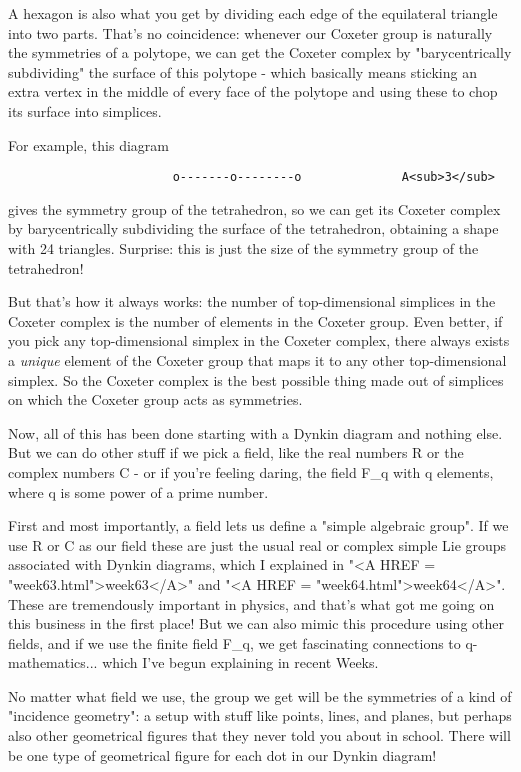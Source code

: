 A hexagon is also what you get by dividing each edge of the equilateral
triangle into two parts.  That's no coincidence: whenever our Coxeter
group is naturally the symmetries of a polytope, we can get the Coxeter
complex by "barycentrically subdividing" the surface of this polytope -
which basically means sticking an extra vertex in the middle of every
face of the polytope and using these to chop its surface into simplices.

For example, this diagram

\begin{verbatim}
                       o-------o--------o              A<sub>3</sub>
\end{verbatim}
    
gives the symmetry group of the tetrahedron, so we can get its Coxeter
complex by barycentrically subdividing the surface of the tetrahedron,
obtaining a shape with 24 triangles.  Surprise: this is just the size
of the symmetry group of the tetrahedron!  

But that's how it always works: the number of top-dimensional simplices
in the Coxeter complex is the number of elements in the Coxeter group. 
Even better, if you pick any top-dimensional simplex in the Coxeter
complex, there always exists a \emph{unique} element of the Coxeter group
that maps it to any other top-dimensional simplex.   So the Coxeter
complex is the best possible thing made out of simplices on which the
Coxeter group acts as symmetries.

Now, all of this has been done starting with a Dynkin diagram and
nothing else.  But we can do other stuff if we pick a field, like the
real numbers R or the complex numbers C - or if you're feeling daring,
the field F_{q} with q elements, where q is some power of a prime number.

First and most importantly, a field lets us define a "simple algebraic
group".  If we use R or C as our field these are just the usual real
or complex simple Lie groups associated with Dynkin diagrams, which 
I explained in "<A HREF = "week63.html">week63</A>" and "<A HREF = "week64.html">week64</A>".  These are tremendously important 
in physics, and that's what got me going on this business in the first
place!   But we can also mimic this procedure using other fields, and 
if we use the finite field F_{q}, we get fascinating connections to 
q-mathematics... which I've begun explaining in recent Weeks.  

No matter what field we use, the group we get will be the symmetries 
of a kind of "incidence geometry": a setup with stuff like points, 
lines, and planes, but perhaps also other geometrical figures
that they never told you about in school.  There will be one type
of geometrical figure for each dot in our Dynkin diagram!

